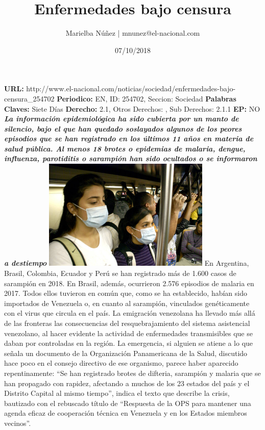 \documentclass{article}%
\title{\textbf{Enfermedades bajo censura}}%
\author{Marielba Núñez | mnunez@el{-}nacional.com}%
\date{07/10/2018}%
\begin{document}
%
\normalsize%
\maketitle%
\textbf{URL: }%
http://www.el{-}nacional.com/noticias/sociedad/enfermedades{-}bajo{-}censura\_254702\newline%
%
\textbf{Periodico: }%
EN, %
ID: %
254702, %
Seccion: %
Sociedad\newline%
%
\textbf{Palabras Claves: }%
Siete Días\newline%
%
\textbf{Derecho: }%
2.1, %
Otros Derechos: %
, %
Sub Derechos: %
2.1.1\newline%
%
\textbf{EP: }%
NO\newline%
\newline%
%
\textbf{\textit{La información epidemiológica ha sido cubierta por un manto de silencio, bajo el que han quedado soslayados algunos de los peores episodios que se han registrado en los últimos 11 años en materia de salud pública. Al menos 18 brotes o epidemias de malaria, dengue, influenza, parotiditis o sarampión han sido ocultados o se informaron a destiempo}}%
\newline%
\newline%
%
\includegraphics[width=300px]{159.jpg}%
\newline%
%
En Argentina, Brasil, Colombia, Ecuador y Perú se han registrado más de 1.600 casos de sarampión en 2018. En Brasil, además, ocurrieron 2.576 episodios de malaria en 2017. Todos ellos tuvieron en común que, como se ha establecido, habían sido importados de Venezuela o, en cuanto al sarampión, vinculados genéticamente con el virus que circula en el país.%
\newline%
%
La emigración venezolana ha llevado más allá de las fronteras las consecuencias del resquebrajamiento del sistema asistencial venezolano, al hacer evidente la actividad de enfermedades transmisibles que se daban por controladas en la región. La emergencia, si alguien se atiene a lo que señala un documento de la Organización Panamericana de la Salud, discutido hace poco en el consejo directivo de ese organismo, parece haber aparecido repentinamente: “Se han registrado brotes de difteria, sarampión y malaria que se han propagado con rapidez, afectando a muchos de los 23 estados del país y el Distrito Capital al mismo tiempo”, indica el texto que describe la crisis, bautizado con el rebuscado título de “Respuesta de la OPS para mantener una agenda eficaz de cooperación técnica en Venezuela y en los Estados miembros vecinos”.%
\end{document}
